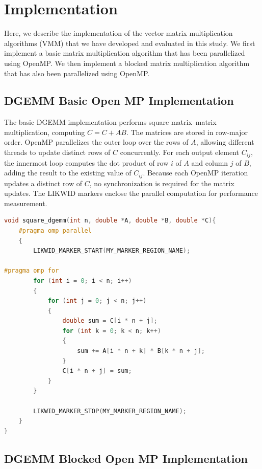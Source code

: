 
\section{Implementation}
\label{sec:implementation}
Here, we describe the implementation of the vector matrix multiplication algorithms (VMM) that we have developed and evaluated in this study. We first implement a basic matrix multiplication algorithm that has been parallelized using OpenMP. We then implement a blocked matrix multiplication algorithm that has also been parallelized using OpenMP. 

\subsection{DGEMM Basic Open MP Implementation}

The basic DGEMM implementation performs square matrix--matrix multiplication, computing \(C = C + AB\). The matrices are stored in row-major order. OpenMP parallelizes the outer loop over the rows of \(A\), allowing different threads to update distinct rows of \(C\) concurrently. For each output element \(C_{ij}\), the innermost loop computes the dot product of row \(i\) of \(A\) and column \(j\) of \(B\), adding the result to the existing value of \(C_{ij}\). Because each OpenMP iteration updates a distinct row of \(C\), no synchronization is required for the matrix updates. The LIKWID markers enclose the parallel computation for performance measurement.


\begin{lstlisting}[caption={Basic DGEMV OMP implementation}, label={lst:basic_dgemv}, name=dgemm_basic_omp, style=mystyle,language=C++]
void square_dgemm(int n, double *A, double *B, double *C){
    #pragma omp parallel
    {
        LIKWID_MARKER_START(MY_MARKER_REGION_NAME);

#pragma omp for
        for (int i = 0; i < n; i++)
        {
            for (int j = 0; j < n; j++)
            {
                double sum = C[i * n + j];
                for (int k = 0; k < n; k++)
                {
                    sum += A[i * n + k] * B[k * n + j];
                }
                C[i * n + j] = sum;
            }
        }

        LIKWID_MARKER_STOP(MY_MARKER_REGION_NAME);
    }
}
\end{lstlisting}

\subsection{DGEMM Blocked Open MP Implementation}

